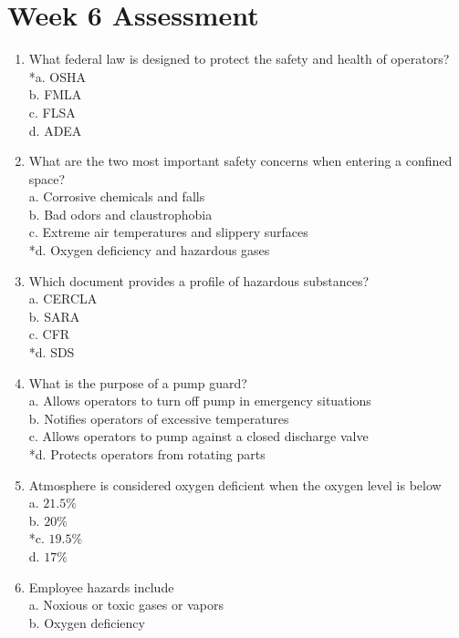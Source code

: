 \section{Week 6 Assessment}
\begin{enumerate}[1.]
\item What federal law is designed to protect the safety and health of operators?\\
*a. OSHA\\
b. FMLA\\
c. FLSA\\
d. ADEA\\
\item What are the two most important safety concerns when entering a confined space?\\
a. Corrosive chemicals and falls\\
b. Bad odors and claustrophobia\\
c. Extreme air temperatures and slippery surfaces\\
*d. Oxygen deficiency and hazardous gases\\
\item Which document provides a profile of hazardous substances?\\
a. CERCLA\\
b. SARA\\
c. CFR\\
*d. SDS\\
\item What is the purpose of a pump guard?\\
a. Allows operators to turn off pump in emergency situations\\
b. Notifies operators of excessive temperatures\\
c. Allows operators to pump against a closed discharge valve\\
*d. Protects operators from rotating parts\\
\item Atmosphere is considered oxygen deficient when the oxygen level is below\\
a. $21.5 \%$\\
b. $20 \%$\\
*c. $19.5 \%$\\
d. $17 \%$\\
\item Employee hazards include\\
a. Noxious or toxic gases or vapors\\
b. Oxygen deficiency\\

\end{enumerate}
